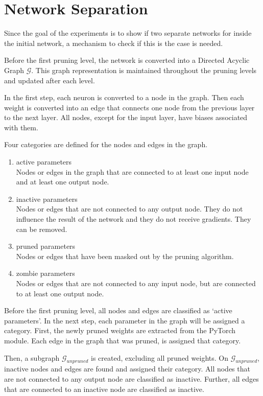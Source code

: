 \section{Network Separation}
Since the goal of the experiments is to show if two separate networks for inside the initial network, a mechanism to check if this is the case is needed.

Before the first pruning level, the network is converted into a Directed Acyclic Graph $\mathcal{G}$.
This graph representation is maintained throughout the pruning levels and updated after each level.

In the first step, each neuron is converted to a node in the graph.
Then each weight is converted into an edge that connects one node from the previous layer to the next layer.
All nodes, except for the input layer, have biases associated with them.

Four categories are defined for the nodes and edges in the graph.
\begin{enumerate}
    \item active parameters  \\
    Nodes or edges in the graph that are connected to at least one input node and at least one output node.
    \item inactive parameters \\
    Nodes or edges that are not connected to any output node. They do not influence the result of the network and they do not receive gradients. They can be removed.
    \item pruned parameters \\
    Nodes or edges that have been masked out by the pruning algorithm.
    \item zombie parameters \\
    Nodes or edges that are not connected to any input node, but are connected to at least one output node.
\end{enumerate}
Before the first pruning level, all nodes and edges are classified as `active parameters'.
In the next step, each parameter in the graph will be assigned a category.
First, the newly pruned weights are extracted from the PyTorch module.
Each edge in the graph that was pruned, is assigned that category.

Then, a subgraph $\mathcal{G}_{unpruned}$ is created, excluding all pruned weights.
On $\mathcal{G}_{unpruned}$, inactive nodes and edges are found and assigned their category.
All nodes that are not connected to any output node are classified as inactive.
Further, all edges that are connected to an inactive node are classified as inactive.

